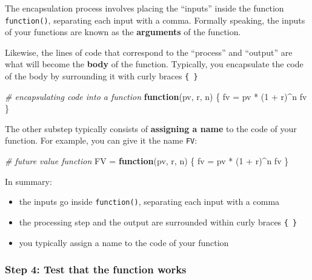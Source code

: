 \documentclass[
]{book}
\newenvironment{Shaded}{\begin{snugshade}}{\end{snugshade}}
\newcommand{\CommentTok}[1]{\textcolor[rgb]{0.56,0.35,0.01}{\textit{#1}}}
\newcommand{\ControlFlowTok}[1]{\textcolor[rgb]{0.13,0.29,0.53}{\textbf{#1}}}
\newcommand{\DecValTok}[1]{\textcolor[rgb]{0.00,0.00,0.81}{#1}}
\newcommand{\NormalTok}[1]{#1}
\newcommand{\OtherTok}[1]{\textcolor[rgb]{0.56,0.35,0.01}{#1}}
\newcommand{\SpecialCharTok}[1]{\textcolor[rgb]{0.00,0.00,0.00}{#1}}
\begin{document}
The encapsulation process involves placing the ``inputs'' inside the function
\texttt{function()}, separating each input with a comma. Formally speaking, the
inputs of your functions are known as the \textbf{arguments} of the function.

Likewise, the lines of code that correspond to the ``process'' and ``output'' are
what will become the \textbf{body} of the function. Typically, you encapsulate the
code of the body by surrounding it with curly braces \texttt{\{\ \}}

\begin{Shaded}
\begin{Highlighting}[]
\CommentTok{\# encapsulating code into a function}
\ControlFlowTok{function}\NormalTok{(pv, r, n) \{}
\NormalTok{  fv }\OtherTok{=}\NormalTok{ pv }\SpecialCharTok{*}\NormalTok{ (}\DecValTok{1} \SpecialCharTok{+}\NormalTok{ r)}\SpecialCharTok{\^{}}\NormalTok{n}
\NormalTok{  fv}
\NormalTok{\}}
\end{Highlighting}
\end{Shaded}

The other substep typically consists of \textbf{assigning a name} to the code of
your function. For example, you can give it the name \texttt{FV}:

\begin{Shaded}
\begin{Highlighting}[]
\CommentTok{\# future value function}
\NormalTok{FV }\OtherTok{=} \ControlFlowTok{function}\NormalTok{(pv, r, n) \{}
\NormalTok{  fv }\OtherTok{=}\NormalTok{ pv }\SpecialCharTok{*}\NormalTok{ (}\DecValTok{1} \SpecialCharTok{+}\NormalTok{ r)}\SpecialCharTok{\^{}}\NormalTok{n}
\NormalTok{  fv}
\NormalTok{\}}
\end{Highlighting}
\end{Shaded}

In summary:

\begin{itemize}
\item
  the inputs go inside \texttt{function()}, separating each input with a comma
\item
  the processing step and the output are surrounded within curly braces \texttt{\{\ \}}
\item
  you typically assign a name to the code of your function
\end{itemize}

\hypertarget{step-4-test-that-the-function-works}{%
\subsubsection*{Step 4: Test that the function works}\label{step-4-test-that-the-function-works}}
\end{document}
